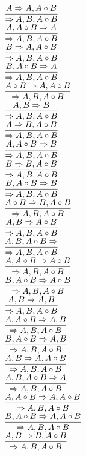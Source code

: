 \documentclass[11pt]{article}
\begin{document}
\begin{center}
\bigskip
\\$\infer{\Rightarrow A, B, A\circ B}{A\Rightarrow A, A\circ B}$
\bigskip
\\$\infer{\Rightarrow A, B, A\circ B}{A, A\circ B\Rightarrow A}$
\bigskip
\\$\infer{\Rightarrow A, B, A\circ B}{B\Rightarrow A, A\circ B}$
\bigskip
\\$\infer{\Rightarrow A, B, A\circ B}{B, A\circ B\Rightarrow A}$
\bigskip
\\$\infer{\Rightarrow A, B, A\circ B}{A\circ B\Rightarrow A, A\circ B}$
\bigskip
\\$\infer{\Rightarrow A, B, A\circ B}{A, B\Rightarrow B}$
\bigskip
\\$\infer{\Rightarrow A, B, A\circ B}{A\Rightarrow B, A\circ B}$
\bigskip
\\$\infer{\Rightarrow A, B, A\circ B}{A, A\circ B\Rightarrow B}$
\bigskip
\\$\infer{\Rightarrow A, B, A\circ B}{B\Rightarrow B, A\circ B}$
\bigskip
\\$\infer{\Rightarrow A, B, A\circ B}{B, A\circ B\Rightarrow B}$
\bigskip
\\$\infer{\Rightarrow A, B, A\circ B}{A\circ B\Rightarrow B, A\circ B}$
\bigskip
\\$\infer{\Rightarrow A, B, A\circ B}{A, B\Rightarrow A\circ B}$
\bigskip
\\$\infer{\Rightarrow A, B, A\circ B}{A, B, A\circ B\Rightarrow }$
\bigskip
\\$\infer{\Rightarrow A, B, A\circ B}{A, A\circ B\Rightarrow A\circ B}$
\bigskip
\\$\infer{\Rightarrow A, B, A\circ B}{B, A\circ B\Rightarrow A\circ B}$
\bigskip
\\$\infer{\Rightarrow A, B, A\circ B}{A, B\Rightarrow A, B}$
\bigskip
\\$\infer{\Rightarrow A, B, A\circ B}{A, A\circ B\Rightarrow A, B}$
\bigskip
\\$\infer{\Rightarrow A, B, A\circ B}{B, A\circ B\Rightarrow A, B}$
\bigskip
\\$\infer{\Rightarrow A, B, A\circ B}{A, B\Rightarrow A, A\circ B}$
\bigskip
\\$\infer{\Rightarrow A, B, A\circ B}{A, B, A\circ B\Rightarrow A}$
\bigskip
\\$\infer{\Rightarrow A, B, A\circ B}{A, A\circ B\Rightarrow A, A\circ B}$
\bigskip
\\$\infer{\Rightarrow A, B, A\circ B}{B, A\circ B\Rightarrow A, A\circ B}$
\bigskip
\\$\infer{\Rightarrow A, B, A\circ B}{A, B\Rightarrow B, A\circ B}$

\end{center}
\end{document}
